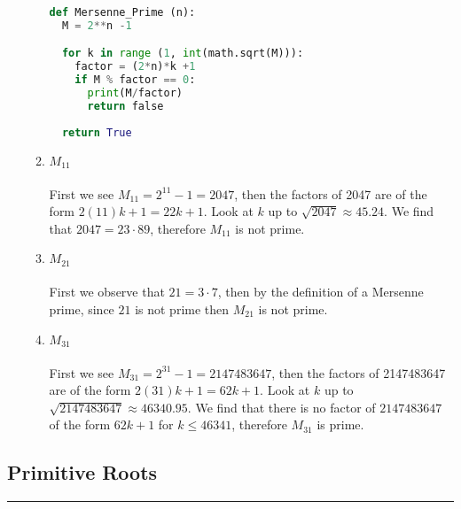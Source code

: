 \documentclass[class=article, crop=false]{standalone}
\begin{document}
\begin{enumerate}
\begin{enumerate}
\begin{center}
\begin{lstlisting}[language=Python]
def Mersenne_Prime (n):
  M = 2**n -1

  for k in range (1, int(math.sqrt(M))):
	factor = (2*n)*k +1
	if M % factor == 0:
	  print(M/factor)
	  return false
  
  return True
\end{lstlisting}
\end{center}


  \item
	$M_{11}$ \\\\
	First we see $M_{11} = 2^{11} - 1= 2047$, then the factors of 2047 are of the form
	$2(11)k+1 = 22k + 1$. Look at $k$ up to $\sqrt{2047}\approx 45.24$. We find that
	$2047 = 23\cdot 89$, therefore $M_{11}$ is not prime.
  \item
	$M_{21}$ \\\\
	First we observe that $21=3\cdot 7$, then by the definition of a Mersenne prime, since $21$ is
	not prime then $M_{21}$ is not prime.
  \item
	$M_{31}$ \\\\
	First we see $M_{31} = 2^{31} -1=2147483647$, then the factors of 2147483647 are of the form
	$2(31)k+1 = 62k+1$. Look at $k$ up to $\sqrt{2147483647} \approx 46340.95$. We find that
	there is no factor of $2147483647$ of the form $62k+1$ for $k\leq 46341$, therefore $M_{31}$ is prime.
  \end{enumerate}

\end{enumerate}

\subsection{Primitive Roots}
\hfill {}
\rule{\textwidth}{1pt}\\
\end{document}
